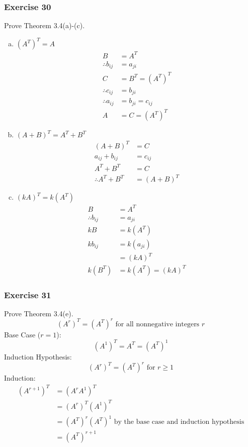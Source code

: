 \documentclass{math}
\begin{document}
\subsubsection*{Exercise 30}
Prove Theorem 3.4(a)-(c).
\begin{enumerate}[(a)]
  \item \( (A^T)^T = A \)
  \begin{align*}
    B &= A^T \\
    \therefore b_{ij} &= a_{ji} \\
    C &= B^T = (A^T)^T \\
    \therefore c_{ij} &= b_{ji} \\
    \therefore a_{ij} &= b_{ji} = c_{ij} \\
    A &= C = (A^T)^T
  \end{align*}
  \item \( (A+B)^T = A^T+B^T \)
  \begin{align*}
    (A+B)^T &= C \\
    a_{ij}+b_{ij} &= c_{ij} \\
    A^T+B^T &= C \\
    \therefore A^T+B^T &= (A+B)^T
  \end{align*}
  \item \( (kA)^T = k(A^T) \)
  \begin{align*}
    B &= A^T \\
    \therefore b_{ij} &= a_{ji} \\
    kB &= k(A^T) \\
    kb_{ij} &= k(a_{ji}) \\
    &= (kA)^T \\
    k(B^T) &= k(A^T) = (kA)^T
  \end{align*}
\end{enumerate}

\subsubsection*{Exercise 31}
Prove Theorem 3.4(e).
\[ (A^r)^T = (A^T)^r \text{ for all nonnegative integers } r \]
Base Case (\( r = 1 \)):
\[ (A^1)^T = A^T = (A^T)^1 \]
Induction Hypothesis:
\[ (A^r)^T = (A^T)^r \text{ for } r\ge1 \]
Induction:
\begin{align*}
  (A^{r+1})^T &= (A^rA^1)^T \\
  &= (A^r)^T(A^1)^T \\
  &= (A^T)^r(A^T)^1 \text{ by the base case and induction hypothesis} \\
  &= (A^T)^{r+1}
\end{align*}
\end{document}
